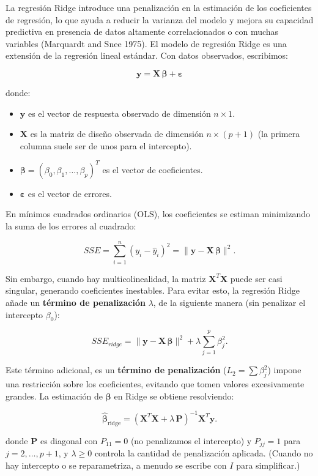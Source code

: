 \documentclass[
  letterpaper,
  DIV=11,
  numbers=noendperiod]{scrreprt}
\providecommand{\tightlist}{%
  \setlength{\itemsep}{0pt}\setlength{\parskip}{0pt}}
\begin{document}
La regresión Ridge introduce una penalización en la estimación de los
coeficientes de regresión, lo que ayuda a reducir la varianza del modelo
y mejora su capacidad predictiva en presencia de datos altamente
correlacionados o con muchas variables (Marquardt and Snee 1975). El
modelo de regresión Ridge es una extensión de la regresión lineal
estándar. Con datos observados, escribimos:

\[
\mathbf{y}= \mathbf{X} \, \boldsymbol{\beta} + \boldsymbol{\varepsilon}
\]

donde:

\begin{itemize}
\tightlist
\item
  \(\mathbf{y}\) es el vector de respuesta observado de dimensión
  \(n \times 1\).
\item
  \(\mathbf{X}\) es la matriz de diseño observada de dimensión
  \(n \times (p+1)\) (la primera columna suele ser de unos para el
  intercepto).
\item
  \(\boldsymbol{\beta} = (\beta_0, \beta_1, \dots, \beta_p)^T\) es el
  vector de coeficientes.
\item
  \(\boldsymbol{\varepsilon}\) es el vector de errores.
\end{itemize}

En mínimos cuadrados ordinarios (OLS), los coeficientes se estiman
minimizando la suma de los errores al cuadrado:

\[
SSE = \sum_{i=1}^{n} (y_i - \hat{y}_i)^2 = \| 
\mathbf{y} - \mathbf{X} \, \boldsymbol{\beta} \|^2.
\]

Sin embargo, cuando hay multicolinealidad, la matriz
\(\mathbf{X}^T \mathbf{X}\) puede ser casi singular, generando
coeficientes inestables. Para evitar esto, la regresión Ridge añade un
\textbf{término de penalización} \(\lambda\), de la siguiente manera
(sin penalizar el intercepto \(\beta_0\)):

\[
SSE_{ridge} = \| \mathbf{y} - \mathbf{X} \, \boldsymbol{\beta} \|^2 + \lambda \sum_{j=1}^{p} \beta_j^2.
\]

Este término adicional, es un \textbf{término de penalización}
(\(L_2=\sum \beta_j^2\)) impone una restricción sobre los coeficientes,
evitando que tomen valores excesivamente grandes. La estimación de
\(\boldsymbol{\beta}\) en Ridge se obtiene resolviendo:

\[
\hat{\boldsymbol{\beta}}_{\text{ridge}} = (\mathbf{X}^T \mathbf{X} + \lambda \, \mathbf{P})^{-1} 
\mathbf{X}^T \mathbf{y}.
\]

donde \(\mathbf{P}\) es diagonal con \(P_{11}=0\) (no penalizamos el
intercepto) y \(P_{jj}=1\) para \(j=2,\dots,p+1\), y \(\lambda \geq 0\)
controla la cantidad de penalización aplicada. (Cuando no hay intercepto
o se reparametriza, a menudo se escribe con \(I\) para simplificar.)
\end{document}
